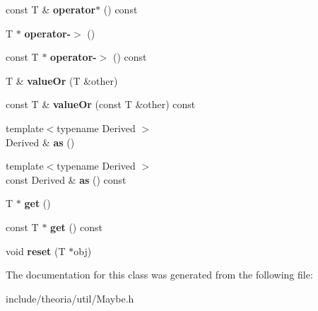 \begin{DoxyCompactItemize}
\mbox{\label{classtheoria_1_1util_1_1Maybe_a9000a809c918d529a2462e1d53ac138d}} 
const T \& {\bfseries operator$\ast$} () const
\item 
\mbox{\label{classtheoria_1_1util_1_1Maybe_ae85df3b0214529075af8010ed943ae83}} 
T $\ast$ {\bfseries operator-\/$>$} ()
\item 
\mbox{\label{classtheoria_1_1util_1_1Maybe_a064989af954077e2817c1c4c0bf8d87f}} 
const T $\ast$ {\bfseries operator-\/$>$} () const
\item 
\mbox{\label{classtheoria_1_1util_1_1Maybe_a0277381962cd4f2dc1d92f75a4cd964c}} 
T \& {\bfseries value\+Or} (T \&other)
\item 
\mbox{\label{classtheoria_1_1util_1_1Maybe_aabda3ca7f3ffd841653ae0f9dff29c8e}} 
const T \& {\bfseries value\+Or} (const T \&other) const
\item 
\mbox{\label{classtheoria_1_1util_1_1Maybe_adfa406b81887a9dd40683e1c690d7367}} 
{\footnotesize template$<$typename Derived $>$ }\\Derived \& {\bfseries as} ()
\item 
\mbox{\label{classtheoria_1_1util_1_1Maybe_a5a30bc268a9bdb9f7a174d36d13754df}} 
{\footnotesize template$<$typename Derived $>$ }\\const Derived \& {\bfseries as} () const
\item 
\mbox{\label{classtheoria_1_1util_1_1Maybe_aeee7f778958a3c253f7ba57d190e55fe}} 
T $\ast$ {\bfseries get} ()
\item 
\mbox{\label{classtheoria_1_1util_1_1Maybe_aee0adf6d385b3120f9d91267c2ddf513}} 
const T $\ast$ {\bfseries get} () const
\item 
\mbox{\label{classtheoria_1_1util_1_1Maybe_a2e841f2d88d2fefa3d9936a1edadfae4}} 
void {\bfseries reset} (T $\ast$obj)
\end{DoxyCompactItemize}


The documentation for this class was generated from the following file\+:\begin{DoxyCompactItemize}
\item 
include/theoria/util/Maybe.\+h\end{DoxyCompactItemize}
